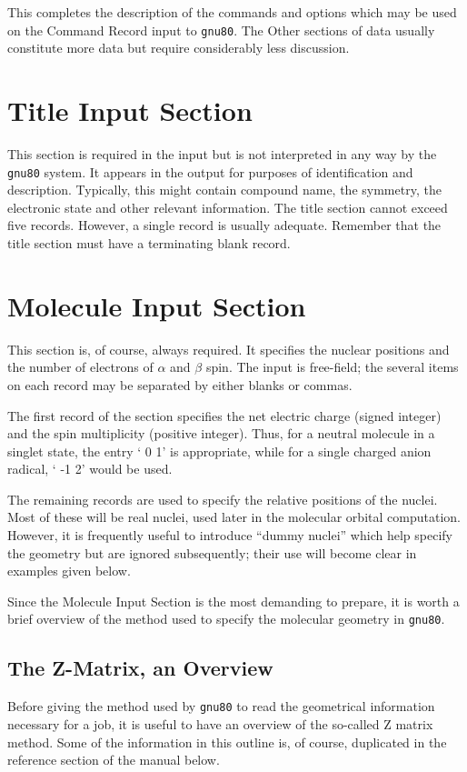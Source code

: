 This completes the description of the commands and options
which may be used on the Command Record input to {\tt gnu80}. The Other
sections of data usually constitute more data but require considerably less
discussion.
\section{\sf Title Input Section}
This section is required in the input but is not interpreted in any
way by the {\tt gnu80} system. It appears in the output for purposes
of identification and description. Typically, this might contain
compound name, the symmetry, the electronic state and other relevant
information.
The title section cannot exceed five records. However, a single record
is usually adequate. 
Remember that the title section must have a terminating blank record.
\section{\sf Molecule Input Section}
\label{molinput}
This section is, of course, always required. It specifies the nuclear positions
and the number of electrons of $\alpha$ and $\beta$ spin. The input is
free-field; the several items on each record may be separated by either
blanks or commas.

The first record of the section specifies the net electric charge
(signed integer) and the spin multiplicity (positive integer). Thus,
for a neutral molecule in a singlet state, the entry ` 0 1' is
appropriate, while for a single charged anion radical, ` -1 2' 
would be used.

The remaining records are used to specify the relative positions of
the nuclei. Most of these will be real nuclei, used later in the
molecular orbital computation. However, it is frequently useful to
introduce ``dummy nuclei'' which help specify the geometry but are
ignored subsequently; their use will become clear in examples given
below.

Since the Molecule Input Section is the most demanding to prepare,
it is worth a brief overview of the method used to specify the
molecular geometry in {\tt gnu80}.
\subsection{\sf The Z-Matrix, an Overview}
Before giving the method used by {\tt gnu80} to read the geometrical
information necessary for a job, it is useful to have an
overview of the so-called Z matrix method. Some of the
information in this outline is, of course, duplicated in the
reference section of the manual below.


